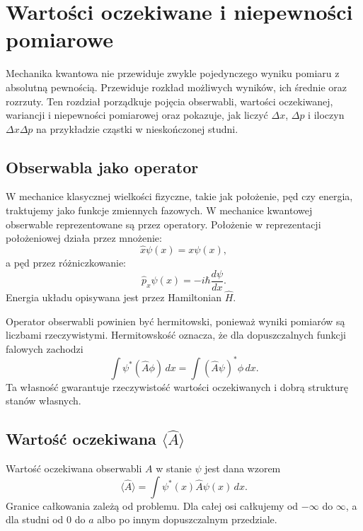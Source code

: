 \chapter{Wartości oczekiwane i niepewności pomiarowe}

\begin{summarybox}
Mechanika kwantowa nie przewiduje zwykle pojedynczego wyniku pomiaru z absolutną
pewnością. Przewiduje rozkład możliwych wyników, ich średnie oraz rozrzuty. Ten
rozdział porządkuje pojęcia obserwabli, wartości oczekiwanej, wariancji i
niepewności pomiarowej oraz pokazuje, jak liczyć \(\Delta x\), \(\Delta p\) i
iloczyn \(\Delta x\Delta p\) na przykładzie cząstki w nieskończonej studni.
\end{summarybox}

\section{Obserwabla jako operator}

W mechanice klasycznej wielkości fizyczne, takie jak położenie, pęd czy energia, traktujemy jako funkcje zmiennych fazowych. W mechanice kwantowej obserwable reprezentowane są przez operatory. Położenie w reprezentacji położeniowej działa przez mnożenie:
\begin{equation}
    \hat{x}\psi(x)=x\psi(x),
\end{equation}
a pęd przez różniczkowanie:
\begin{equation}
    \hat{p}_x\psi(x)=-i\hbar\frac{d\psi}{dx}.
\end{equation}
Energia układu opisywana jest przez Hamiltonian \(\hat{H}\).

Operator obserwabli powinien być hermitowski, ponieważ wyniki pomiarów są liczbami rzeczywistymi. Hermitowskość oznacza, że dla dopuszczalnych funkcji falowych zachodzi
\begin{equation}
    \int \psi^*(\hat{A}\phi)\,dx
    =
    \int (\hat{A}\psi)^*\phi\,dx.
\end{equation}
Ta własność gwarantuje rzeczywistość wartości oczekiwanych i dobrą strukturę stanów własnych.

\section{Wartość oczekiwana \texorpdfstring{\(\langle \hat{A}\rangle\)}{<A>}}

Wartość oczekiwana obserwabli \(A\) w stanie \(\psi\) jest dana wzorem
\begin{equation}
    \langle \hat{A}\rangle
    =\int \psi^*(x)\hat{A}\psi(x)\,dx.
\end{equation}
Granice całkowania zależą od problemu. Dla całej osi całkujemy od \(-\infty\) do \(\infty\), a dla studni od \(0\) do \(a\) albo po innym dopuszczalnym przedziale.

